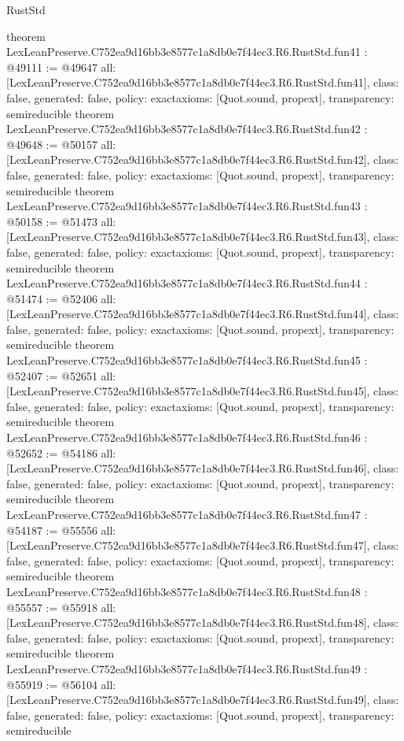 \begin{lexlean}{RustStd}
\begin{coremodule}
{}
theorem LexLeanPreserve.C752ea9d16bb3e8577c1a8db0e7f44ec3.R6.RustStd.fun41 : @49111 := @49647 {
  all: [LexLeanPreserve.C752ea9d16bb3e8577c1a8db0e7f44ec3.R6.RustStd.fun41],
  class: false,
  generated: false,
  policy: exact{axioms: [Quot.sound, propext]},
  transparency: semireducible
}
theorem LexLeanPreserve.C752ea9d16bb3e8577c1a8db0e7f44ec3.R6.RustStd.fun42 : @49648 := @50157 {
  all: [LexLeanPreserve.C752ea9d16bb3e8577c1a8db0e7f44ec3.R6.RustStd.fun42],
  class: false,
  generated: false,
  policy: exact{axioms: [Quot.sound, propext]},
  transparency: semireducible
}
theorem LexLeanPreserve.C752ea9d16bb3e8577c1a8db0e7f44ec3.R6.RustStd.fun43 : @50158 := @51473 {
  all: [LexLeanPreserve.C752ea9d16bb3e8577c1a8db0e7f44ec3.R6.RustStd.fun43],
  class: false,
  generated: false,
  policy: exact{axioms: [Quot.sound, propext]},
  transparency: semireducible
}
theorem LexLeanPreserve.C752ea9d16bb3e8577c1a8db0e7f44ec3.R6.RustStd.fun44 : @51474 := @52406 {
  all: [LexLeanPreserve.C752ea9d16bb3e8577c1a8db0e7f44ec3.R6.RustStd.fun44],
  class: false,
  generated: false,
  policy: exact{axioms: [Quot.sound, propext]},
  transparency: semireducible
}
theorem LexLeanPreserve.C752ea9d16bb3e8577c1a8db0e7f44ec3.R6.RustStd.fun45 : @52407 := @52651 {
  all: [LexLeanPreserve.C752ea9d16bb3e8577c1a8db0e7f44ec3.R6.RustStd.fun45],
  class: false,
  generated: false,
  policy: exact{axioms: [Quot.sound, propext]},
  transparency: semireducible
}
theorem LexLeanPreserve.C752ea9d16bb3e8577c1a8db0e7f44ec3.R6.RustStd.fun46 : @52652 := @54186 {
  all: [LexLeanPreserve.C752ea9d16bb3e8577c1a8db0e7f44ec3.R6.RustStd.fun46],
  class: false,
  generated: false,
  policy: exact{axioms: [Quot.sound, propext]},
  transparency: semireducible
}
theorem LexLeanPreserve.C752ea9d16bb3e8577c1a8db0e7f44ec3.R6.RustStd.fun47 : @54187 := @55556 {
  all: [LexLeanPreserve.C752ea9d16bb3e8577c1a8db0e7f44ec3.R6.RustStd.fun47],
  class: false,
  generated: false,
  policy: exact{axioms: [Quot.sound, propext]},
  transparency: semireducible
}
theorem LexLeanPreserve.C752ea9d16bb3e8577c1a8db0e7f44ec3.R6.RustStd.fun48 : @55557 := @55918 {
  all: [LexLeanPreserve.C752ea9d16bb3e8577c1a8db0e7f44ec3.R6.RustStd.fun48],
  class: false,
  generated: false,
  policy: exact{axioms: [Quot.sound, propext]},
  transparency: semireducible
}
theorem LexLeanPreserve.C752ea9d16bb3e8577c1a8db0e7f44ec3.R6.RustStd.fun49 : @55919 := @56104 {
  all: [LexLeanPreserve.C752ea9d16bb3e8577c1a8db0e7f44ec3.R6.RustStd.fun49],
  class: false,
  generated: false,
  policy: exact{axioms: [Quot.sound, propext]},
  transparency: semireducible
}
\end{coremodule}
\end{lexlean}
